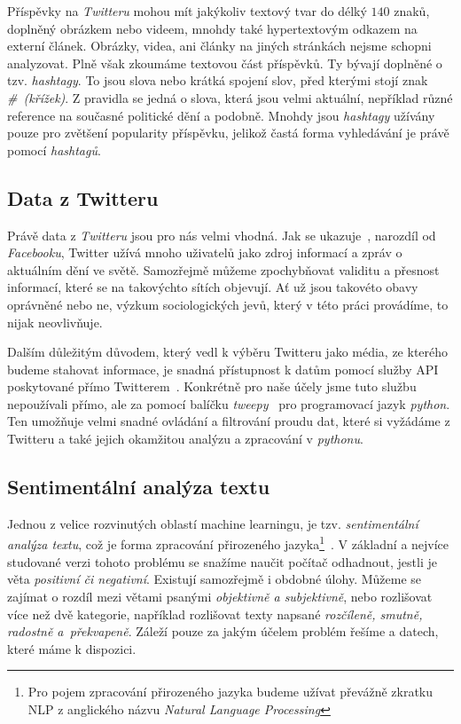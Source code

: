 \documentclass[12pt, a4paper]{article}
\numberwithin{equation}{section} 	%
\begin{document}
Příspěvky na \textit{Twitteru} mohou mít jakýkoliv textový tvar do délký $140$ znaků, doplněný obrázkem nebo videem, mnohdy také hypertextovým odkazem na externí článek. Obrázky, videa, ani články na jiných stránkách nejsme schopni analyzovat. Plně však zkoumáme textovou část příspěvků. Ty bývají doplněné o tzv. \textit{hashtagy}. To jsou slova nebo krátká spojení slov, před kterými stojí znak \textit{\#~(křížek)}. Z pravidla se jedná o slova, která jsou velmi aktuální, nepříklad různé reference na současné politické dění a podobně. Mnohdy jsou \textit{hashtagy} užívány pouze pro zvětšení popularity příspěvku, jelikož častá forma vyhledávání je právě pomocí \textit{hashtagů}.

\subsection{Data z Twitteru}
\noindent Právě data z \textit{Twitteru} jsou pro nás velmi vhodná. Jak se ukazuje~\cite{whyNotFb}, narozdíl od \textit{Facebooku}, Twitter užívá mnoho uživatelů jako zdroj informací a zpráv o aktuálním dění ve světě. Samozřejmě můžeme zpochybňovat validitu a přesnost informací, které se na takovýchto sítích objevují. Ať už jsou takovéto obavy oprávněné nebo ne, výzkum sociologických jevů, který v této práci provádíme, to nijak neovlivňuje.

Dalším důležitým důvodem, který vedl k výběru Twitteru jako média, ze kterého budeme stahovat informace, je snadná přístupnost k datům pomocí služby API poskytované přímo Twitterem~\cite{twitterAPI}. Konkrétně pro naše účely jsme tuto službu nepoužívali přímo, ale za pomocí balíčku \textit{tweepy}~\cite{tweepy} pro programovací jazyk \textit{python}. Ten umožňuje velmi snadné ovládání a filtrování proudu dat, které si vyžádáme z Twitteru a také jejich okamžitou analýzu a zpracování v \textit{pythonu}.

\subsection{Sentimentální analýza textu}
\noindent Jednou z velice rozvinutých oblastí machine learningu, je tzv. \textit{sentimentální a\-na\-lý\-za textu}, což je forma zpracování přirozeného jazyka\footnote{Pro pojem zpracování přirozeného jazyka budeme užívat převážně zkratku NLP z anglického názvu \textit{Natural Language Processing}}~\cite{NLTKbook}. V základní a nejvíce studované verzi tohoto problému se snažíme naučit počítač odhadnout, jestli je věta \textit{positivní či negativní}. Existují samozřejmě i obdobné úlohy. Můžeme se zajímat o rozdíl mezi větami psanými \textit{objektivně a subjektivně}, nebo rozlišovat více než dvě kategorie, například rozlišovat texty napsané \textit{rozčíleně, smutně, radostně a~překvapeně}. Záleží pouze za jakým účelem problém řešíme a datech, které máme k dispozici.
\end{document}
